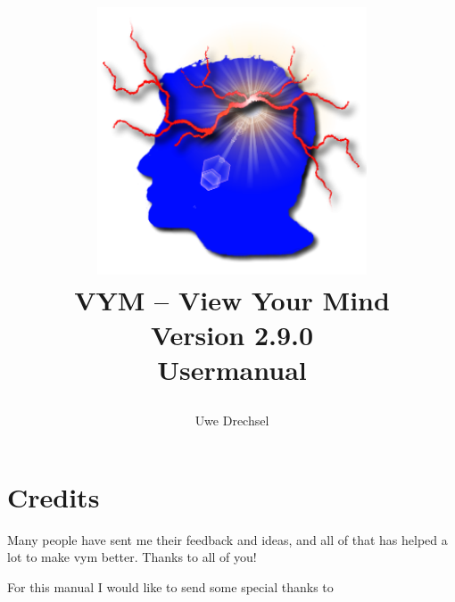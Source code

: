 \documentclass[12pt,a4paper]{article}
\newcommand{\vym}{{\sc vym }}
\begin{document}
\title{
    \includegraphics[width=8cm]{images/vym-logo-new.png} \\ 
    VYM  -- View Your Mind \\ 
    {\small Version 2.9.0} \\ 
    { Usermanual }
\author{\textcopyright Uwe Drechsel  }
}


\maketitle

\newpage

\tableofcontents

\newpage

\section*{Credits}
Many people have sent me their feedback and ideas, and all of that has
helped a lot to make \vym better. Thanks to all of you!

For this manual I would like to send some special thanks to
\end{document}

